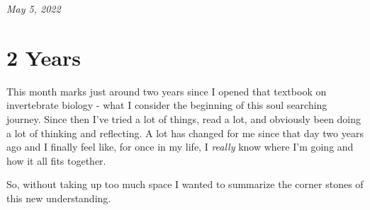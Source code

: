 \documentclass[10pt,a5paper]{book}
\begin{document}
\textit{May 5, 2022}

\section{2 Years}

This month marks just around two years since I opened that textbook on invertebrate biology - what I consider the beginning of this soul searching journey. Since then I've tried a lot of things, read a lot, and obviously been doing a lot of thinking and reflecting. A lot has changed for me since that day two years ago and I finally feel like, for once in my life, I \textit{really} know where I'm going and how it all fits together. 

So, without taking up too much space I wanted to summarize the corner stones of this new understanding. 
\end{document}
